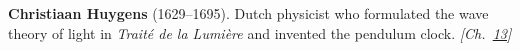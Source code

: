 \textbf{Christiaan Huygens} (1629–1695). Dutch physicist who formulated the wave theory of light in \emph{Trait\'{e} de la Lumi\`{e}re} and invented the pendulum clock. \emph{[Ch.~\hyperref[ch:poissonsspot]{13}]}

